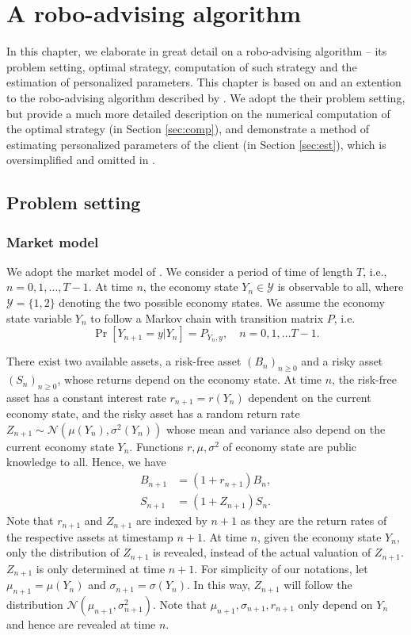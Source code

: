 \chapter{A robo-advising algorithm}\label{sec:approach}

In this chapter, we elaborate in great detail on a robo-advising algorithm -- its problem setting, optimal strategy, computation of such strategy and the estimation of personalized parameters. This chapter is based on and an extention to the robo-advising algorithm described by . We adopt the their problem setting, but provide a much more detailed description on the numerical computation of the optimal strategy (in Section \ref{sec:comp}), and demonstrate a method of estimating personalized parameters of the client (in Section \ref{sec:est}), which is oversimplified and omitted in . 

\section{Problem setting}\label{sec:setting}
\subsection{Market model}\label{sec:market_model}
We adopt the market model of . We consider a period of time of length $T$, i.e., $n=0,1,\ldots,T-1$. At time $n$, the economy state $Y_n\in\mathcal{Y}$ is observable to all, where $\mathcal{Y}=\{1,2\}$ denoting the two possible economy states. We assume the economy state variable $Y_n$ to follow a Markov chain with transition matrix $P$, i.e. $$\Pr[Y_{n+1}=y|Y_n]=P_{Y_n, y},\quad n=0,1,\ldots T-1.$$

There exist two available assets, a risk-free asset $(B_n)_{n\geq 0}$ and a risky asset $(S_n)_{n\geq 0}$, whose returns depend on the economy state. At time $n$, the risk-free asset has a constant interest rate $r_{n+1}=r(Y_n)$ dependent on the current economy state, and the risky asset has a random return rate $Z_{n+1}\sim\mathcal{N}(\mu(Y_n),\sigma^2(Y_n))$ whose mean and variance also depend on the current economy state $Y_n$. Functions $r,\mu,\sigma^2$ of economy state are public knowledge to all. Hence, we have \begin{equation}
    \begin{aligned}
        B_{n+1}&=(1+r_{n+1})B_n,\\
        S_{n+1}&=(1+Z_{n+1})S_n.
    \end{aligned}
\end{equation} Note that $r_{n+1}$ and $Z_{n+1}$ are indexed by $n+1$ as they are the return rates of the respective assets at timestamp $n+1$. At time $n$, given the economy state $Y_n$, only the distribution of $Z_{n+1}$ is revealed, instead of the actual valuation of  $Z_{n+1}$. $Z_{n+1}$ is only determined at time $n+1$. For simplicity of our notations, let $\mu_{n+1}=\mu(Y_n)$ and $\sigma_{n+1}=\sigma(Y_n)$. In this way, $Z_{n+1}$ will follow the distribution $\mathcal{N}(\mu_{n+1},\sigma^2_{n+1})$. Note that $\mu_{n+1},\sigma_{n+1},r_{n+1}$ only depend on $Y_n$ and hence are revealed at time $n$.


